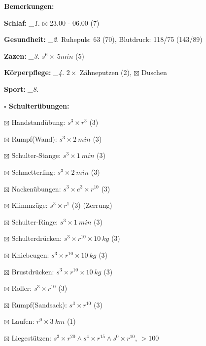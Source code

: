 \documentclass[10pt,a4paper]{article}
\newcommand\prop[1] {{\color {alizarin} {\bf #1}}}        %
\newcommand\mand[1] {{\color {burntorange} {\bf #1}}}     %
\newcommand\topspace{\vskip -15pt \hskip 20pt}
\newcommand\n[1] { {\sl #1.} \hskip 5pt }
\begin{document}
\begin{mdframed}[style=daystyle]
  \begin{labeling}{{\mand {Bemerkungen:}}}
    \setlength\itemsep{-3pt}
  \item[{\mand {Schlaf:}}]        \n{\_1} $\boxtimes$ 23.00 - 06.00 (7)
  \item[{\mand {Gesundheit:}}]    \n{\_2} Ruhepuls: 63 (70), Blutdruck: 118/75 (143/89)
  \item[{\mand {Zazen:}}]         \n{\_3} $s^6 \times\ 5 min$ (5)
  \item[{\mand {Körperpflege:}}]  \n{\_4} $2 \times$ Zähneputzen (2), $\boxtimes$ Duschen
  \item[{\mand {Sport:}}]         \n{\_8}
    \topspace
    \begin{minipage}{0.75\textwidth}  
      \begin{labeling}{\prop {$\square$ {Schulterübungen:}}} 
        \setlength\itemsep{-3pt}
      \item[$\boxtimes$ Handstandübung:]  $s^3 \times r^{3}$ (3)
      \item[$\boxtimes$ Rumpf(Wand):]     $s^3 \times 2\ min$ (3)
      \item[$\boxtimes$ Schulter-Stange:] $s^3 \times 1\ min$ (3)
      \item[$\boxtimes$ Schmetterling:]   $s^3 \times 2\ min$ (3)
      \item[$\boxtimes$ Nackenübungen:]   $s^3 \times e^3 \times r^{10}$ (3)
      \item[$\boxtimes$ Klimmzüge:]       $s^3 \times r^1$ (3) (Zerrung)
      \item[$\boxtimes$ Schulter-Ringe:]  $s^3 \times 1\ min$ (3)
      \item[$\boxtimes$ Schulterdrücken:] $s^3 \times r^{10} \times 10\ kg$ (3)
      \item[$\boxtimes$ Kniebeugen:]      $s^3 \times r^{10} \times 10\ kg$ (3)
      \item[$\boxtimes$ Brustdrücken:]    $s^3 \times r^{10} \times 10\ kg$ (3)
      \item[$\boxtimes$ Roller:]          $s^3 \times r^{10}$ (3)
      \item[$\boxtimes$ Rumpf(Sandsack):] $s^3 \times r^{10}$ (3)
      \item[$\boxtimes$ Laufen:]          $r^0 \times 3\ km$ (1)
      \item[$\boxtimes$ Liegestützen:]    $s^3 \times r^{20} \land s^4 \times r^{15} \land s^0 \times r^{10}$, $> 100$
      \end{labeling}

\end{minipage}
\end{labeling}
\end{mdframed}
\end{document}
